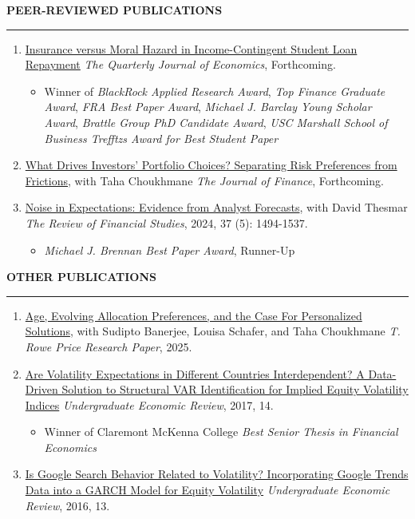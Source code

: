 \documentclass[a4paper, 10pt]{article}
\newcounter{mycounter}
\newcommand{\cvsec}[1]
{
	\needspace{2\baselineskip}
	\noindent \textbf{#1}
	
	\vspace{2pt}
	
	\hrule
	
	\bigskip
}
\newenvironment{cvcontinue}[1]
{
	\cvsec{#1}
	\begin{enumerate}
		\setcounter{enumi}{\themycounter}
	}
	{
	\setcounter{mycounter}{\theenumi}
	\end{enumerate}
}
\begin{document}
\begin{cvcontinue}{PEER-REVIEWED PUBLICATIONS}
	\item \href{https://www.timdesilva.me/files/papers/jmp_deSilva.pdf}{Insurance versus Moral Hazard in Income-Contingent Student Loan Repayment} \newline \emph{The Quarterly Journal of Economics}, Forthcoming.
	\begin{itemize}
		\item Winner of \emph{BlackRock Applied Research Award}, \emph{Top Finance Graduate Award}, \emph{FRA Best Paper Award}, \emph{Michael J. Barclay Young Scholar Award}, \emph{Brattle Group PhD Candidate Award}, \emph{USC Marshall School of Business Trefftzs Award for Best Student Paper}
	\end{itemize}
	\item \href{https://www.timdesilva.me/files/papers/preferences_frictions.pdf}{What Drives Investors' Portfolio Choices? Separating Risk Preferences from Frictions}, with Taha Choukhmane \newline \emph{The Journal of Finance}, Forthcoming.
	\item \href{https://www.timdesilva.me/files/papers/noise_expectations.pdf}{Noise in Expectations: Evidence from Analyst Forecasts}, with David Thesmar \newline \emph{The Review of Financial Studies}, 2024, 37 (5): 1494-1537.
	\begin{itemize}
		\item \emph{Michael J. Brennan Best Paper Award}, Runner-Up
	\end{itemize}
\end{cvcontinue}

\begin{cvcontinue}{OTHER PUBLICATIONS}
	\item \href{http://timhdesilva.github.io/files/papers/trp_white_paper.pdf}{Age, Evolving Allocation Preferences, and the Case For Personalized Solutions}, with Sudipto Banerjee, Louisa Schafer, and Taha Choukhmane \newline \emph{T. Rowe Price Research Paper}, 2025.
	\item \href{https://digitalcommons.iwu.edu/uer/vol14/iss1/8/}{Are Volatility Expectations in Different Countries Interdependent? A Data-Driven Solution to Structural VAR Identification for Implied Equity Volatility Indices} \newline \emph{Undergraduate Economic Review}, 2017, 14.
	\begin{itemize}
		\item Winner of Claremont McKenna College \emph{Best Senior Thesis in Financial Economics}
	\end{itemize}
	\item \href{https://digitalcommons.iwu.edu/uer/vol13/iss1/13/}{Is Google Search Behavior Related to Volatility? Incorporating Google Trends Data into a GARCH Model for Equity Volatility} \newline \emph{Undergraduate Economic Review}, 2016, 13.\\
\end{cvcontinue}
\end{document}
